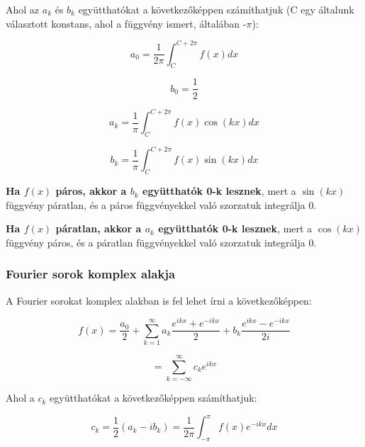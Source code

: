 \documentclass{article}
\begin{document}
Ahol az $a_k$ és $b_k$ együtthatókat a következőképpen számíthatjuk (C egy általunk választott konstans, ahol a függvény ismert, általában -$\pi$):

\begin{equation*}
    a_0 = \frac{1}{2\pi} \int_{C}^{C+2\pi} f(x) dx
\end{equation*}

\begin{equation*}
    b_0= \frac{1}{2}
\end{equation*}

\begin{equation*}
    a_k = \frac{1}{\pi} \int_{C}^{C+2\pi} f(x) \cos(kx) dx
\end{equation*}

\begin{equation*}
    b_k = \frac{1}{\pi} \int_{C}^{C+2\pi} f(x) \sin(kx) dx
\end{equation*}

\vspace{4mm}

\textbf{Ha $f(x)$ páros, akkor a $b_k$ együtthatók 0-k lesznek}, mert a $\sin(kx)$ függ\-vény páratlan, és a páros függvényekkel való szorzatuk integrálja 0.

\textbf{Ha $f(x)$ páratlan, akkor a $a_k$ együtthatók 0-k lesznek}, mert a $\cos(kx)$ függ\-vény páros, és a páratlan függvényekkel való szorzatuk integrálja 0.

\subsubsection{Fourier sorok komplex alakja}

A Fourier sorokat komplex alakban is fel lehet írni a következőképpen:

\begin{equation*}
    f(x) = \frac{a_0}{2} + \sum_{k=1}^{\infty} a_k \frac{e^{ikx} + e^{-ikx}}{2} + b_k \frac{e^{ikx} - e^{-ikx}}{2i}
\end{equation*}

\begin{equation*}
    = \sum_{k=-\infty}^{\infty} c_k e^{ikx}
\end{equation*}

Ahol a $c_k$ együtthatókat a következőképpen számíthatjuk:

\begin{equation*}
    c_k = \frac{1}{2} \left( a_k - ib_k \right) = \frac{1}{2\pi} \int_{-\pi}^{\pi} f(x) e^{-ikx} dx
\end{equation*}
\end{document}
